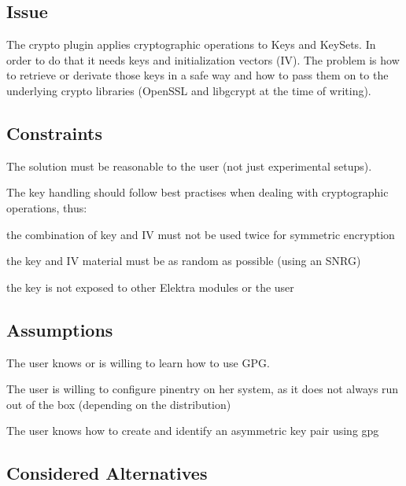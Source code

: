 \subsection*{Issue}

The crypto plugin applies cryptographic operations to Keys and Key\+Sets. In order to do that it needs keys and initialization vectors (I\+V). The problem is how to retrieve or derivate those keys in a safe way and how to pass them on to the underlying crypto libraries (Open\+S\+S\+L and libgcrypt at the time of writing).

\subsection*{Constraints}

The solution must be reasonable to the user (not just experimental setups).

The key handling should follow best practises when dealing with cryptographic operations, thus\+:


\begin{DoxyItemize}
\item the combination of key and I\+V must not be used twice for symmetric encryption
\item the key and I\+V material must be as random as possible (using an S\+N\+R\+G)
\item the key is not exposed to other Elektra modules or the user
\end{DoxyItemize}

\subsection*{Assumptions}


\begin{DoxyItemize}
\item The user knows or is willing to learn how to use G\+P\+G.
\item The user is willing to configure {\ttfamily pinentry} on her system, as it does not always run out of the box (depending on the distribution)
\item The user knows how to create and identify an asymmetric key pair using {\ttfamily gpg}
\end{DoxyItemize}

\subsection*{Considered Alternatives}

